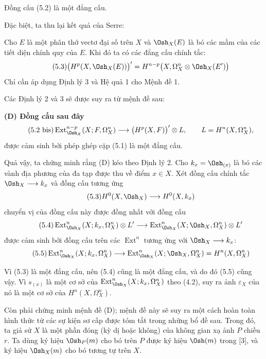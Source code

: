  Đồng cấu (5.2) là một đẳng cấu.

Đặc biệt, ta thu lại kết quả của Serre:

 Cho $E$ là một phân thớ vectơ đại số trên $X$ và
$\Osh_X(E)$ là bó các mầm của các tiết diện chính quy của $E$. Khi đó ta có các
đẳng cấu chính tắc:
\begin{equation}\tag{5.3}
  \bigl(H^{p}(X,\Osh_X(E))\bigr)'
  =H^{n-p}\bigl(X,\Omega_X^{n}\otimes\Osh_X(E')\bigr)
\end{equation}
Chỉ cần áp dụng Định lý 3 và Hệ quả 1 cho Mệnh đề 1.

Các Định lý 2 và 3 sẽ được suy ra từ mệnh đề sau:

\noindent\textbf{(D) Đồng cấu sau đây}
\begin{equation}\tag{5.2 bis}
  \operatorname{Ext}_{\Osh_X}^{n-p}(X;F,\Omega_X^{n})
  \longrightarrow\bigl(H^{p}(X,F)\bigr)'\otimes L,
  \qquad L=H^{n}(X,\Omega_X^{n}),
\end{equation}
được cảm sinh bởi phép ghép cặp (5.1) là một đẳng cấu.

Quả vậy, ta chứng minh rằng (D) kéo theo Định lý 2. Cho
$k_x=\Osh_{(x)}$ là bó các vành địa phương của đa tạp được thu về điểm
$x\in X$. Xét đồng cấu chính tắc
$\Osh_X\longrightarrow k_x$ và đồng cấu tương ứng
\begin{equation}\tag{5.3}
  H^{0}(X,\Osh_X)\longrightarrow H^{0}(X,k_x)
\end{equation}
chuyển vị của đồng cấu này được đồng nhất với đồng cấu
\begin{equation}\tag{5.4}
  \operatorname{Ext}_{\Osh_X}^{n}(X;k_x,\Omega_X^{n})\otimes L'
  \longrightarrow
  \operatorname{Ext}_{\Osh_X}^{n}(X;\Osh_X,\Omega_X^{n})\otimes L'
\end{equation}
được cảm sinh bởi đồng cấu trên các $\operatorname{Ext}^{n}$ tương ứng với
$\Osh_X\longrightarrow k_x$:
\begin{equation}\tag{5.5}
  \operatorname{Ext}_{\Osh_X}^{n}(X;k_x,\Omega_X^{n})
  \longrightarrow
  \operatorname{Ext}_{\Osh_X}^{n}(X;\Osh_X,\Omega_X^{n})
  =H^{n}(X,\Omega_X^{n})
\end{equation}


Vì (5.3) là một đẳng cấu, nên (5.4) cũng là một đẳng cấu, và do đó (5.5)
cũng vậy. Vì $s_{(x)}$ là một cơ sở của
$\operatorname{Ext}_{\Osh_X}^{n}(X;k_x,\Omega_X^{n})$ theo (4.2), suy ra ảnh
$\varepsilon_X$ của nó là một cơ sở của $H^{n}(X,\Omega_X^{n})$.

Còn phải chứng minh mệnh đề (D); mệnh đề này sẽ suy ra một cách hoàn toàn hình
thức từ các sự kiện sơ cấp được tóm tắt trong những bổ đề sau. Trong đó, ta giả
sử $X$ là một phần đóng (kỳ dị hoặc không) của không gian xạ ảnh $P$ chiều
$r$. Ta dùng ký hiệu $\Osh_P(m)$ cho bó trên $P$ được ký hiệu $\Osh(m)$ trong
[3], và ký hiệu $\Osh_X(m)$ cho bó tương tự trên $X$.

